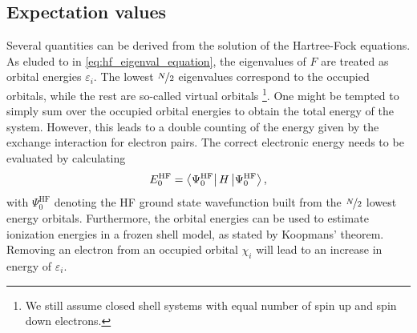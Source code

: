 \subsection{Expectation values}
\label{subsec:background_hf_derived_quantities}
Several quantities can be derived from the solution of the Hartree-Fock equations. As eluded to in \autoref{eq:hf_eigenval_equation}, the eigenvalues of $F$ are treated as orbital energies $\varepsilon_i$. 
The lowest $\nicefrac{N}{2}$ eigenvalues correspond to the occupied orbitals, while the rest are so-called virtual orbitals \footnote{We still assume closed shell systems with equal number of spin up and spin down electrons.}. One might be tempted to simply sum over the occupied orbital energies to obtain the total energy of the system. However, this leads to a double counting of the energy given by the exchange interaction for electron pairs. The correct electronic energy needs to be evaluated by calculating
\begin{equation}
    \label{eq:elec_energy_hf_gs}
    E^\text{HF}_0 =  \bra{\Psi^\text{HF}_0} H \ket{\Psi^\text{HF}_0},
\end{equation}
with $\Psi^\text{HF}_0$ denoting the HF ground state wavefunction built from the $\nicefrac{N}{2}$ lowest energy orbitals.
Furthermore, the orbital energies can be used to estimate ionization energies in a frozen shell model, as stated by Koopmans' theorem. \parencite{ref:koopmans1934} Removing an electron from an occupied orbital $\chi_i$ will lead to an increase in energy of $\varepsilon_i$.

